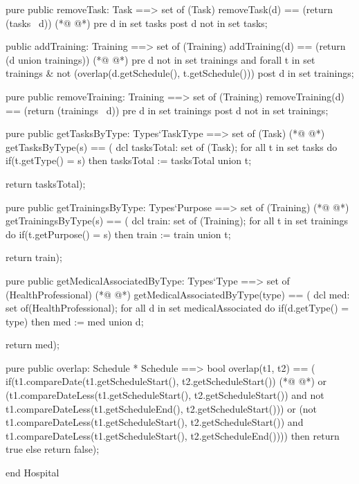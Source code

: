 \begin{vdmpp}[breaklines=true]
 pure public removeTask: Task ==> set of (Task)
  removeTask(d) == (return (tasks \ {d}))
(*@
\label{removeTraining:58}
@*)
 pre d in set tasks
 post d not in set tasks;
 
 public addTraining: Training ==> set of (Training)
  addTraining(d) == (return ({d} union trainings))
(*@
\label{getTasksByType:63}
@*)
 pre d not in set trainings and forall t in set trainings & not (overlap(d.getSchedule(), t.getSchedule()))
 post d in set trainings;
  
 pure public removeTraining: Training ==> set of (Training)
  removeTraining(d) == (return (trainings \ {d}))
 pre d in set trainings
 post d not in set trainings;
 
 pure public getTasksByType: Types`TaskType ==> set of (Task)
(*@
\label{getTrainingsByType:72}
@*)
  getTasksByType(s) == (
              dcl tasksTotal: set of (Task);
              for all t in set tasks do
               if(t.getType() = s)
                then tasksTotal := tasksTotal union {t};
                
              return tasksTotal);
              
 pure public getTrainingsByType: Types`Purpose ==> set of (Training)
(*@
\label{getMedicalAssociatedByType:81}
@*)
  getTrainingsByType(s) == (
              dcl train: set of (Training);
              for all t in set trainings do
               if(t.getPurpose() = s)
                then train := train union {t};
                
              return train);

 pure public getMedicalAssociatedByType: Types`Type ==> set of (HealthProfessional)
(*@
\label{overlap2:90}
@*)
  getMedicalAssociatedByType(type) == (
           dcl med: set of(HealthProfessional);
           for all d in set medicalAssociated do
            if(d.getType() = type)
             then med := med union {d};
            
           return med);
           
 pure public overlap: Schedule * Schedule ==> bool
  overlap(t1, t2) == (
             if(t1.compareDate(t1.getScheduleStart(), t2.getScheduleStart()) 
(*@
\label{overlapTraining:101}
@*)
              or (t1.compareDateLess(t1.getScheduleStart(), t2.getScheduleStart()) 
              and not t1.compareDateLess(t1.getScheduleEnd(), t2.getScheduleStart()))
              or (not t1.compareDateLess(t1.getScheduleStart(), t2.getScheduleStart()) 
              and t1.compareDateLess(t1.getScheduleStart(), t2.getScheduleEnd())))
              then return true
             else
              return false);
              
end Hospital
\end{vdmpp}
